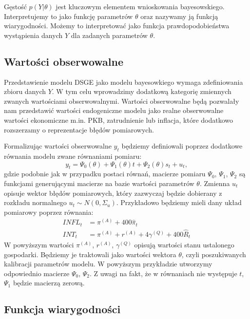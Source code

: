 Gęstość $p(Y|\theta)$ jest kluczowym elementem wnioskowania bayesowskiego. Interpretujemy to jako funkcję parametrów $\theta$ oraz nazywamy ją funkcją wiarygodności. Możemy to interpretować jako funkcja prawdopodobieństwa wystąpienia danych $Y$ dla zadanych parametrów $\theta$.

\subsection{Wartości obserwowalne}
\label{sec:observable}

Przedstawienie modelu DSGE jako modelu bayesowkiego wymaga zdefiniowania zbioru danych $Y$. W tym celu wprowadzimy dodatkową kategorię zmiennych zwanych wartościami obserwowalnymi. Wartości obserwowalne będą pozwalały nam przedstawić wartości endogeniczne modelu jako realne obserwowalne wartości ekonomiczne m.in. PKB, zatrudnienie lub inflacja, które dodatkowo rozszerzamy o reprezentacje błędów pomiarowych.

Formalizując wartości obserwowalne $y_t$ będziemy definiowali poprzez dodatkowe równania modelu zwane równaniami pomiaru:
\begin{equation}
\label{eqn:measurement}
    y_t=\Psi_0(\theta) + \Psi_1(\theta)t + \Psi_2(\theta)s_t + u_t,
\end{equation}
gdzie podobnie jak w przypadku postaci równań, macierze pomiaru $\Psi_0$, $\Psi_1$, $\Psi_2$ są funkcjami generującymi macierze na bazie wartości parametrów $\theta$. Zmienna $u_t$ opisuje wektor błędów pomiarowych, który zazwyczaj będzie dobierany z rozkładu normalnego $u_t \sim N(0, \Sigma_{u})$. Przykładowo będziemy mieli dany układ pomiarowy poprzez równania:
\begin{align}
        INFL_t &= \pi^{(A)} + 400 \hat{\pi}_t \\
        INT_t &= \pi^{(A)} + r^{(A)} + 4\gamma^{(Q)} + 400 \hat{R}_t
\end{align}
W powyższym wartości $\pi^{(A)}$, $r^{(A)}$, $\gamma^{(Q)} $ opisują wartości stanu ustalonego gospodarki. Będziemy je traktowali jako wartości wektora $\theta$, czyli poszukiwanych kalibracji parametrów modelu. W powyższym przykładzie utworzymy odpowiednio macierze $\Psi_0$, $\Psi_2$. Z uwagi na fakt, że w równaniach nie występuje $t$, $\Psi_1$ będzie macierzą zerową.

\subsection{Funkcja wiarygodności}
\label{sec:likelihood}

